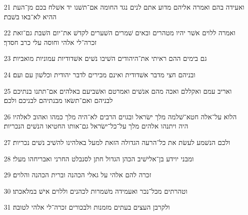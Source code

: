 \par 21 ואעידה בהם ואמרה אליהם מדוע אתם לנים נגד החומה אם־תשׁנו יד אשׁלח בכם מן־העת ההיא לא־באו בשׁבת׃
\par 22 ואמרה ללוים אשׁר יהיו מטהרים ובאים שׁמרים השׁערים לקדשׁ את־יום השׁבת גם־זאת זכרה־לי אלהי וחוסה עלי כרב חסדך׃
\par 23 גם בימים ההם ראיתי את־היהודים השׁיבו נשׁים אשׁדודיות עמוניות מואביות׃
\par 24 ובניהם חצי מדבר אשׁדודית ואינם מכירים לדבר יהודית וכלשׁון עם ועם׃
\par 25 ואריב עמם ואקללם ואכה מהם אנשׁים ואמרטם ואשׁביעם באלהים אם־תתנו בנתיכם לבניהם ואם־תשׂאו מבנתיהם לבניכם ולכם׃
\par 26 הלוא על־אלה חטא־שׁלמה מלך ישׂראל ובגוים הרבים לא־היה מלך כמהו ואהוב לאלהיו היה ויתנהו אלהים מלך על־כל־ישׂראל גם־אותו החטיאו הנשׁים הנכריות׃
\par 27 ולכם הנשׁמע לעשׂת את כל־הרעה הגדולה הזאת למעל באלהינו להשׁיב נשׁים נכריות׃
\par 28 ומבני יוידע בן־אלישׁיב הכהן הגדול חתן לסנבלט החרני ואבריחהו מעלי׃
\par 29 זכרה להם אלהי על גאלי הכהנה וברית הכהנה והלוים׃
\par 30 וטהרתים מכל־נכר ואעמידה משׁמרות לכהנים וללוים אישׁ במלאכתו׃
\par 31 ולקרבן העצים בעתים מזמנות ולבכורים זכרה־לי אלהי לטובה׃


